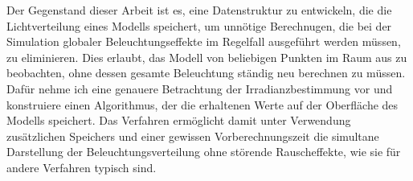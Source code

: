 Der Gegenstand dieser Arbeit ist es, eine Datenstruktur zu entwickeln, die die Lichtverteilung eines Modells speichert, um unnötige Berechnugen, die bei der Simulation globaler Beleuchtungseffekte im Regelfall ausgeführt werden müssen, zu eliminieren.
Dies erlaubt, das Modell von beliebigen Punkten im Raum aus zu beobachten, ohne dessen gesamte Beleuchtung ständig neu berechnen zu müssen.
Dafür nehme ich eine genauere Betrachtung der Irradianzbestimmung vor und konstruiere einen Algorithmus, der die erhaltenen Werte auf der Oberfläche des Modells speichert.
Das Verfahren ermöglicht damit unter Verwendung zusätzlichen Speichers und einer gewissen Vorberechnungszeit die simultane Darstellung der Beleuchtungsverteilung ohne störende Rauscheffekte, wie sie für andere Verfahren typisch sind.